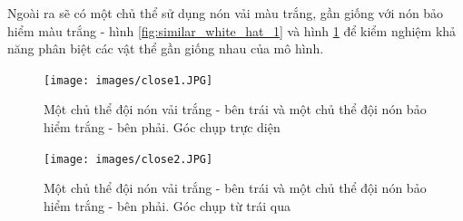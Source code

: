 Ngoài ra sẽ có một chủ thể sử dụng nón vải màu trắng, gần giống với nón bảo hiểm màu trắng - hình \ref{fig:similar_white_hat_1} và hình \ref{fig:similar_white_hat_2} để kiểm nghiệm khả năng phân biệt các vật thể gần giống nhau của mô hình.
\begin{figure}[ht!]%
\centering
\begin{minipage}{0.45\textwidth}
\texttt{[image: images/close1.JPG]}
\caption{Một chủ thể đội nón vải trắng - bên trái và một chủ thể đội nón bảo hiểm trắng - bên phải. Góc chụp trực diện}
\label{fig:similar_white_hat_1}
\end{minipage}\hfill
\begin{minipage}{0.45\textwidth}
\texttt{[image: images/close2.JPG]}
\caption{Một chủ thể đội nón vải trắng - bên trái và một chủ thể đội nón bảo hiểm trắng - bên phải. Góc chụp từ trái qua}
\label{fig:similar_white_hat_2}
\end{minipage}
\end{figure}

